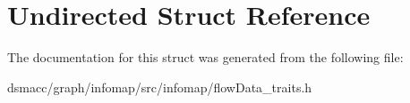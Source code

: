 \hypertarget{structUndirected}{}\section{Undirected Struct Reference}
\label{structUndirected}


The documentation for this struct was generated from the following file\+:\begin{DoxyCompactItemize}
\item 
dsmacc/graph/infomap/src/infomap/flow\+Data\+\_\+traits.\+h\end{DoxyCompactItemize}
